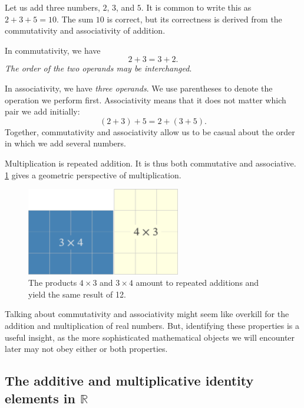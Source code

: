 \documentclass[
  a4paper,
]{article}
\begin{document}
Let us add three numbers, \(2\), \(3\), and \(5\). It is common to write
this as \(2 + 3 + 5 = 10\). The sum \(10\) is correct, but its
correctness is derived from the commutativity and associativity of
addition.

In commutativity, we have \[
2 + 3 = 3 + 2.
\] \emph{The order of the two operands may be interchanged}.

In associativity, we have \emph{three operands}. We use parentheses to
denote the operation we perform first. Associativity means that it does
not matter which pair we add initially: \[
(2 + 3) + 5 = 2 + (3 + 5).
\] Together, commutativity and associativity allow us to be casual about
the order in which we add several numbers.

Multiplication is repeated addition. It is thus both commutative and
associative. \cref{fig:mult} gives a geometric perspective of
multiplication.

\begin{figure}
\hypertarget{fig:mult}{%
\centering
\includegraphics[width=0.6\textwidth,height=\textheight]{images/four-by-three.png}
\caption{The products \(4\times3\) and \(3\times4\) amount to repeated
additions and yield the same result of 12.}\label{fig:mult}
}
\end{figure}

Talking about commutativity and associativity might seem like overkill
for the addition and multiplication of real numbers. But, identifying
these properties is a useful insight, as the more sophisticated
mathematical objects we will encounter later may not obey either or both
properties.

\hypertarget{the-additive-and-multiplicative-identity-elements-in-mathbbr}{%
\subsection{\texorpdfstring{The additive and multiplicative identity
elements in
\(\mathbb{R}\)}{The additive and multiplicative identity elements in \textbackslash mathbb\{R\}}}\label{the-additive-and-multiplicative-identity-elements-in-mathbbr}}
\end{document}
